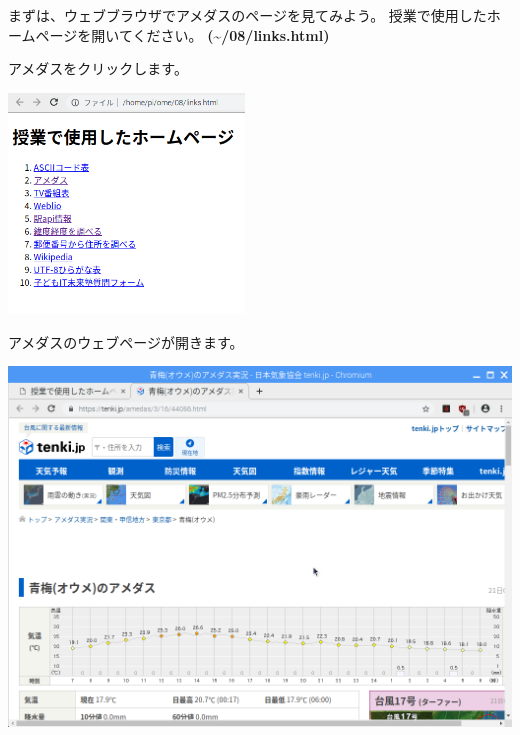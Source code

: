 \documentclass[a4paper,12pt,dvipdfmx]{jarticle}
\begin{document}
\bigskip

まずは、ウェブブラウザでアメダスのページを見てみよう。
授業で使用したホームページを開いてください。
\textbf{({\textasciitilde}/08/links.html)}

アメダスをクリックします。



\begin{center}
\includegraphics[width=6.271cm]{textbook-img017.png}

\end{center}

\bigskip


\bigskip



アメダスのウェブページが開きます。

\begin{center}
\includegraphics[width=14.252cm]{textbook-img028.png}

\end{center}

\bigskip
\end{document}

